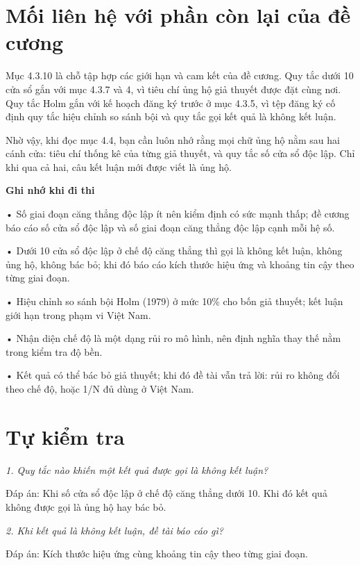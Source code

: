 \section{Mối liên hệ với phần còn lại của đề cương}

Mục 4.3.10 là chỗ tập hợp các giới hạn và cam kết của đề cương. Quy tắc dưới 10 cửa sổ gắn với mục 4.3.7 và 4, vì tiêu chí ủng hộ giả thuyết được đặt cùng nơi. Quy tắc Holm gắn với kế hoạch đăng ký trước ở mục 4.3.5, vì tệp đăng ký cố định quy tắc hiệu chỉnh so sánh bội và quy tắc gọi kết quả là không kết luận.

Nhờ vậy, khi đọc mục 4.4, bạn cần luôn nhớ rằng mọi chữ ủng hộ nằm sau hai cánh cửa: tiêu chí thống kê của từng giả thuyết, và quy tắc số cửa sổ độc lập. Chỉ khi qua cả hai, câu kết luận mới được viết là ủng hộ.

\begin{tcolorbox}[breakable]
\textbf{Ghi nhớ khi đi thi}

• Số giai đoạn căng thẳng độc lập ít nên kiểm định có sức mạnh thấp; đề cương báo cáo số cửa sổ độc lập và số giai đoạn căng thẳng độc lập cạnh mỗi hệ số.

• Dưới 10 cửa sổ độc lập ở chế độ căng thẳng thì gọi là không kết luận, không ủng hộ, không bác bỏ; khi đó báo cáo kích thước hiệu ứng và khoảng tin cậy theo từng giai đoạn.

• Hiệu chỉnh so sánh bội Holm (1979) ở mức 10\% cho bốn giả thuyết; kết luận giới hạn trong phạm vi Việt Nam.

• Nhận diện chế độ là một dạng rủi ro mô hình, nên định nghĩa thay thế nằm trong kiểm tra độ bền.

• Kết quả có thể bác bỏ giả thuyết; khi đó đề tài vẫn trả lời: rủi ro không đổi theo chế độ, hoặc 1/N đủ dùng ở Việt Nam.
\end{tcolorbox}

\section{Tự kiểm tra}

{\itshape 1. Quy tắc nào khiến một kết quả được gọi là không kết luận?\par}

Đáp án: Khi số cửa sổ độc lập ở chế độ căng thẳng dưới 10. Khi đó kết quả không được gọi là ủng hộ hay bác bỏ.

{\itshape 2. Khi kết quả là không kết luận, đề tài báo cáo gì?\par}

Đáp án: Kích thước hiệu ứng cùng khoảng tin cậy theo từng giai đoạn.


